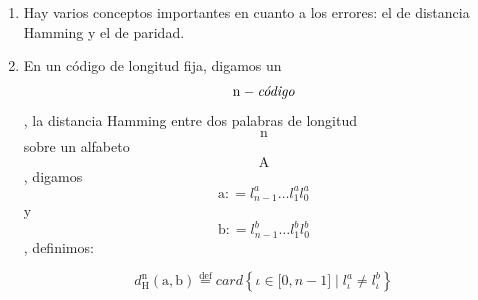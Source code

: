 \begin{enumerate}
\begin{enumerate}
\begin{enumerate}
\begin{enumerate}
        La probabilidad de error sobre un valor 0 o un valor 1 ha de ser
        muy parecida, de forma que la asimetría sea inapreciable.
      \end{enumerate}
    \item
      Hay varios conceptos importantes en cuanto a los errores: el de
      distancia Hamming y el de paridad.
    \item
      En un código de longitud fija, digamos un
      \[\mathtt{\mathrm{n}} - \text{\textit{código}}\], la distancia Hamming
      en\-tre dos palabras de longitud \[\mathtt{\mathrm{n}}\] sobre un
      alfabeto \[\mathtt{\mathrm{A}}\], digamos
      \[\mathtt{\mathrm{a}}{: = l_{n - 1}^{a}}\ldots l_{1}^{a}l_{0}^{a}\]y
      \[\mathtt{\mathrm{b}}{: = l_{n - 1}^{b}}\ldots l_{1}^{b}l_{0}^{b}\],
      definimos:

      \[d_{\mathtt{\mathrm{H}}}^{\mathtt{\mathrm{n}}}\left( \mathtt{\mathrm{a,b}} \right)\overset{\text{def}}{=}\mathit{card}\left\{ {{\iota \in {\lbrack{0,{n - 1}}\rbrack}} \mid {l_{\iota}^{a} \neq l_{\iota}^{b}}} \right\}\]


\end{enumerate}
\end{enumerate}
\end{enumerate}

